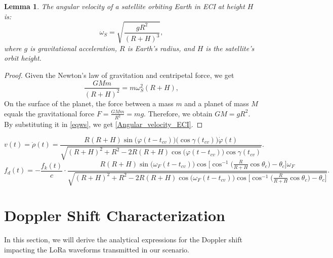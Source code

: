 \documentclass{IEEEtaes}
\theoremstyle{plain}
\newtheorem{lemma}{Lemma}
\begin{document}
\begin{lemma}
The angular velocity of a satellite orbiting Earth in ECI at height \(H\) is:
\begin{equation}
    \label{Angular_velocity_ECI}
    \omega_S = \sqrt{\frac{gR^2}{(R + H)^3}},
\end{equation}
where \(g\) is gravitational acceleration, \(R\) is Earth's radius, and \(H\) is the satellite's orbit height.
\end{lemma}

\begin{proof}
Given the Newton's law of gravitation and centripetal force, we get
\begin{equation}
\frac{GMm}{(R+H)^2} =m\omega_S^2(R+H),\label{eqws}
\end{equation}
On the surface of the planet, the force between a mass \( m \) and a planet of mass \( M \) equals the gravitational force \(F = \frac{GMm}{R^2} = mg\). Therefore, we obtain $GM = gR^2$. By substituting it in \eqref{eqws}, we get \eqref{Angular_velocity_ECI}.

\end{proof}


\begin{figure*}
    \begin{equation}
    \label{relative velocity}
  v(t) = \dot{\rho} (t) = \frac{R(R+H)\sin\big(\varphi(t-t_{c\!v})\big)\big(\cos\gamma(t_{c\!v})\big) \dot{\varphi}(t)}{\sqrt{(R+H)^2+R^2-2R(R+H)\cos\big(\varphi(t-t_{c\!v})\big)\cos\gamma(t_{c\!v})}}.
    \end{equation}
    \begin{equation}
      \label{Doppler}
      f_d(t) = -\frac{f_k(t)}{c}\cdot\frac{R(R+H)\sin\big(\omega_F(t-t_{c\!v})\big)\cos\Big[\cos^{-1}\big (\frac{R}{R+H}\cos\theta_c\big)-\theta_c\Big]\omega_F}{\sqrt{(R+H)^2+R^2-2R(R+H)\cos\big(\omega_F(t-t_{c\!v})\big) \cos\Big[\cos^{-1}\big (\frac{R}{R+H}\cos\theta_c\big)-\theta_c\Big]}}.
    \end{equation}
    \hrulefill
\end{figure*}

\section{Doppler Shift Characterization} 
\label{Doppler_characteriztion}
In this section, we will derive the analytical expressions for the Doppler shift impacting the LoRa waveforms transmitted in our scenario. 
\end{document}
